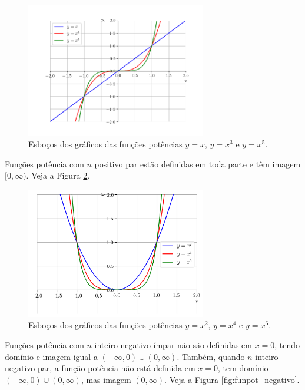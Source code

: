 \begin{figure}[H]
  \centering
  \includegraphics[width=0.7\textwidth]{./cap_funcao/dados/fig_funpot_impar/fig_funpot_impar}
  \caption{Esboços dos gráficos das funções potências $y=x$, $y=x^3$ e $y=x^5$.}
  \label{fig:funpot_impar}
\end{figure}

Funções potência com $n$ positivo par estão definidas em toda parte e têm imagem $[0, \infty)$. Veja a Figura \ref{fig:funpot_par}.

\begin{figure}[H]
  \centering
  \includegraphics[width=0.7\textwidth]{./cap_funcao/dados/fig_funpot_par/fig_funpot_par}
  \caption{Esboços dos gráficos das funções potências $y=x^2$, $y=x^4$ e $y=x^6$.}
  \label{fig:funpot_par}
\end{figure}

Funções potência com $n$ inteiro negativo ímpar não são definidas em $x=0$, tendo domínio e imagem igual a $(-\infty, 0)\cup (0, \infty)$. Também, quando $n$ inteiro negativo par, a função potência não está definida em $x=0$, tem domínio $(-\infty, 0)\cup (0, \infty)$, mas imagem $(0, \infty)$. Veja a Figura \ref{fig:funpot_negativo}.

